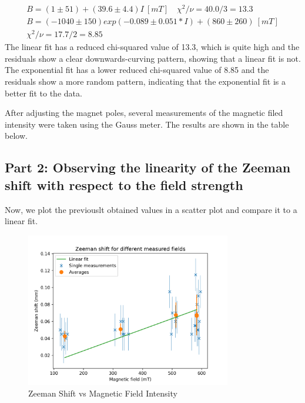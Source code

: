 \begin{gather*}
    B = (1 \pm 51) + (39.6 \pm 4.4)I~[mT] \quad \chi^2 / \nu = 40.0 / 3 = 13.3 \\
    B = (-1040 \pm 150) exp (-0.089 \pm 0.051 * I) + (860 \pm 260)~[mT] \\
    \chi^2 / \nu = 17.7 / 2 = 8.85
\end{gather*}
The linear fit has a reduced chi-squared value of 13.3, which is quite high and the residuals show a clear downwards-curving pattern, showing that a linear fit is not. The exponential fit has a lower reduced chi-squared value of 8.85 and the residuals show a more random pattern, indicating that the exponential fit is a better fit to the data.



After adjusting the magnet poles, several measurements of the magnetic filed intensity were taken using the Gauss meter. The results are shown in the table below.

\subsection{Part 2: Observing the linearity of the Zeeman shift with respect to the field strength}

Now, we plot the previouslt obtained values in a scatter plot and compare it to a linear fit.

\begin{figure}
    \centering
    \includegraphics[width=0.8\textwidth]{Results/img/zeeman_shift_scatter.png}
    \caption{Zeeman Shift vs Magnetic Field Intensity}
\end{figure}

